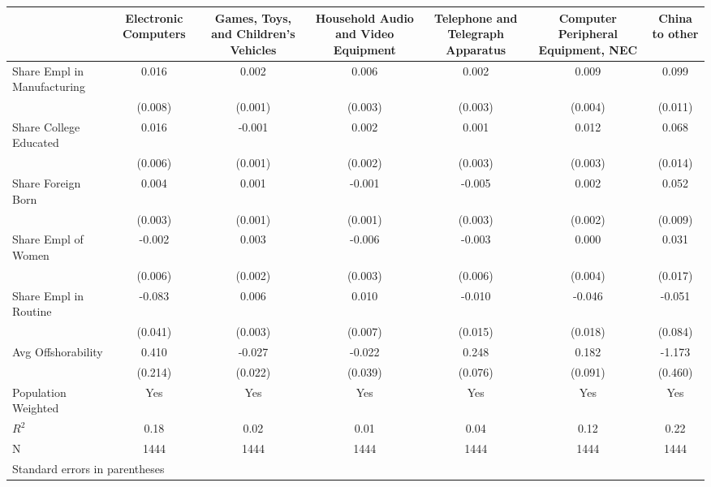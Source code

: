 \begin{tabular}{l*{6}{c}}
\toprule
                &\multicolumn{1}{c}{Electronic Computers}&\multicolumn{1}{c}{Games, Toys, and Children’s Vehicles}&\multicolumn{1}{c}{Household Audio and Video Equipment}&\multicolumn{1}{c}{Telephone and Telegraph Apparatus}&\multicolumn{1}{c}{Computer Peripheral Equipment, NEC}&\multicolumn{1}{c}{China to other}\\
\midrule
Share Empl in Manufacturing&    0.016&    0.002&    0.006&    0.002&    0.009&    0.099\\
                &  (0.008)&  (0.001)&  (0.003)&  (0.003)&  (0.004)&  (0.011)\\
Share College Educated&    0.016&   -0.001&    0.002&    0.001&    0.012&    0.068\\
                &  (0.006)&  (0.001)&  (0.002)&  (0.003)&  (0.003)&  (0.014)\\
Share Foreign Born&    0.004&    0.001&   -0.001&   -0.005&    0.002&    0.052\\
                &  (0.003)&  (0.001)&  (0.001)&  (0.003)&  (0.002)&  (0.009)\\
Share Empl of Women&   -0.002&    0.003&   -0.006&   -0.003&    0.000&    0.031\\
                &  (0.006)&  (0.002)&  (0.003)&  (0.006)&  (0.004)&  (0.017)\\
Share Empl in Routine&   -0.083&    0.006&    0.010&   -0.010&   -0.046&   -0.051\\
                &  (0.041)&  (0.003)&  (0.007)&  (0.015)&  (0.018)&  (0.084)\\
Avg Offshorability&    0.410&   -0.027&   -0.022&    0.248&    0.182&   -1.173\\
                &  (0.214)&  (0.022)&  (0.039)&  (0.076)&  (0.091)&  (0.460)\\
\midrule
Population Weighted&      Yes&      Yes&      Yes&      Yes&      Yes&      Yes\\
$ R^2$          &     0.18&     0.02&     0.01&     0.04&     0.12&     0.22\\
N               &     1444&     1444&     1444&     1444&     1444&     1444\\
\bottomrule
\multicolumn{7}{l}{\footnotesize Standard errors in parentheses}\\
\end{tabular}
